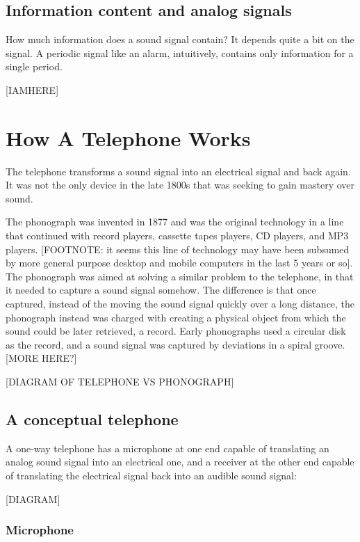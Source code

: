 \documentclass[UTF8]{book}
\begin{document}
\begin{CJK}{UTF8}{gbsn}
\section{Information content and analog signals}

How much information does a sound signal contain? It depends quite a bit on the signal. A periodic signal like an alarm, intuitively, contains only information for a single period.

[IAMHERE]

\chapter{How A Telephone Works}

The telephone transforms a sound signal into an electrical signal and back again. It was not the only device in the late 1800s that was seeking to gain mastery over sound.

The phonograph was invented in 1877 and was the original technology in a line that continued with record players, cassette tapes players, CD players, and MP3 players. [FOOTNOTE: it seems this line of technology may have been subsumed by more general purpose desktop and mobile computers in the last 5 years or so]. The phonograph was aimed at solving a similar problem to the telephone, in that it needed to capture a sound signal somehow. The difference is that once captured, instead of the moving the sound signal quickly over a long distance, the phonograph instead was charged with creating a physical object from which the sound could be later retrieved, a record. Early phonographs used a circular disk as the record, and a sound signal was captured by deviations in a spiral groove. [MORE HERE?]

[DIAGRAM OF TELEPHONE VS PHONOGRAPH]

\section{A conceptual telephone}

A one-way telephone has a microphone at one end capable of translating an analog sound signal into an electrical one, and a receiver at the other end capable of translating the electrical signal back into an audible sound signal:

[DIAGRAM]

\subsection{Microphone}


\end{CJK}
\end{document}
